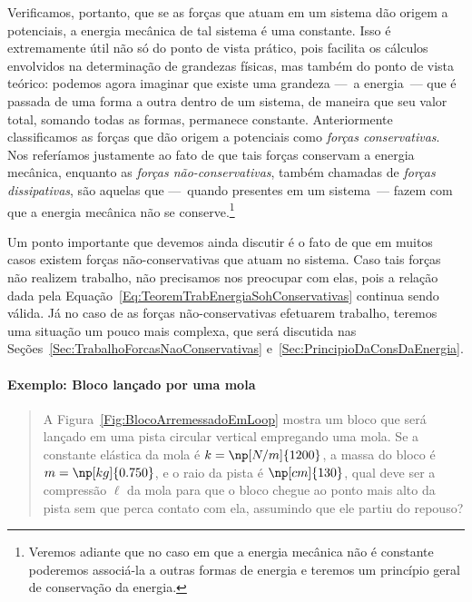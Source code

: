 Verificamos, portanto, que se as forças que atuam em um sistema dão origem a potenciais, a energia mecânica de tal sistema é uma constante. Isso é extremamente útil não só do ponto de vista prático, pois facilita os cálculos envolvidos na determinação de grandezas físicas, mas também do ponto de vista teórico: podemos agora imaginar que existe uma grandeza ---~a energia~--- que é passada de uma forma a outra dentro de um sistema, de maneira que seu valor total, somando todas as formas, permanece constante. Anteriormente classificamos as forças que dão origem a potenciais como \emph{forças conservativas}. Nos referíamos justamente ao fato de que tais forças conservam a energia mecânica, enquanto as \emph{forças não-conservativas}, também chamadas de \emph{forças dissipativas}, são aquelas que ---~quando presentes em um sistema~--- fazem com que a energia mecânica não se conserve.\footnote{Veremos adiante que no caso em que a energia mecânica não é constante poderemos associá-la a outras formas de energia e teremos um princípio geral de conservação da energia.}

Um ponto importante que devemos ainda discutir é o fato de que em muitos casos existem forças não-conservativas que atuam no sistema. Caso tais forças não realizem trabalho, não precisamos nos preocupar com elas, pois a relação dada pela Equação~\eqref{Eq:TeoremTrabEnergiaSohConservativas} continua sendo válida. Já no caso de as forças não-conservativas efetuarem trabalho, teremos uma situação um pouco mais complexa, que será discutida nas Seções~\ref{Sec:TrabalhoForcasNaoConservativas} e~\ref{Sec:PrincipioDaConsDaEnergia}.

\paragraph{Exemplo: Bloco lançado por uma mola}

\begin{quote}
    A Figura~\ref{Fig:BlocoArremessadoEmLoop} mostra um bloco que será lançado em uma pista circular vertical empregando uma mola. Se a constante elástica da mola é $k = \np[N/m]{1200}$, a massa do bloco é $m = \np[kg]{0.750}$, e o raio da pista é $\np[cm]{130}$, qual deve ser a compressão $\ell$ da mola para que o bloco chegue ao ponto mais alto da pista sem que perca contato com ela, assumindo que ele partiu do repouso?
\end{quote}

